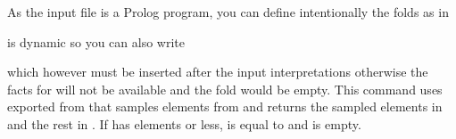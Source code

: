 \documentclass[letterpaper,10pt,english]{sphinxmanual}
\begin{document}
\begin{sphinxVerbatim}[commandchars=\\\{\}]
\PYG{p}{[}\PYG{p}{]}
\PYG{p}{[}\PYG{p}{]}
\end{sphinxVerbatim}

\sphinxAtStartPar
As the input file is a Prolog program, you can define intentionally the folds as in

\begin{sphinxVerbatim}[commandchars=\\\{\}]
\end{sphinxVerbatim}

\sphinxAtStartPar
{} is dynamic so you can also write

\begin{sphinxVerbatim}[commandchars=\\\{\}]
 
\end{sphinxVerbatim}

\sphinxAtStartPar
which however must be inserted after the input interpretations otherwise the facts for  will not be available and the fold  would be empty.
This command uses  exported from 
that samples  elements from  and returns the sampled elements in  and the rest in .
If  has  elements or less,  is equal to  and  is empty.
\end{document}
